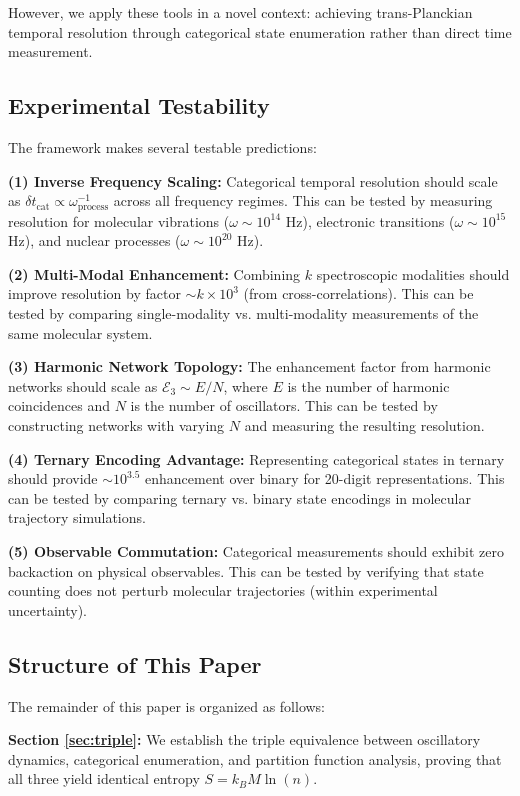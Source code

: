 \documentclass[twocolumn,10pt]{article}
\theoremstyle{remark}
\begin{document}
However, we apply these tools in a novel context: achieving trans-Planckian temporal resolution through categorical state enumeration rather than direct time measurement.

\subsection{Experimental Testability}

The framework makes several testable predictions:

\textbf{(1) Inverse Frequency Scaling:} Categorical temporal resolution should scale as $\delta t_{\text{cat}} \propto \omega_{\text{process}}^{-1}$ across all frequency regimes. This can be tested by measuring resolution for molecular vibrations ($\omega \sim 10^{14}$ Hz), electronic transitions ($\omega \sim 10^{15}$ Hz), and nuclear processes ($\omega \sim 10^{20}$ Hz).

\textbf{(2) Multi-Modal Enhancement:} Combining $k$ spectroscopic modalities should improve resolution by factor $\sim k \times 10^3$ (from cross-correlations). This can be tested by comparing single-modality vs. multi-modality measurements of the same molecular system.

\textbf{(3) Harmonic Network Topology:} The enhancement factor from harmonic networks should scale as $\mathcal{E}_3 \sim E/N$, where $E$ is the number of harmonic coincidences and $N$ is the number of oscillators. This can be tested by constructing networks with varying $N$ and measuring the resulting resolution.

\textbf{(4) Ternary Encoding Advantage:} Representing categorical states in ternary should provide $\sim 10^{3.5}$ enhancement over binary for 20-digit representations. This can be tested by comparing ternary vs. binary state encodings in molecular trajectory simulations.

\textbf{(5) Observable Commutation:} Categorical measurements should exhibit zero backaction on physical observables. This can be tested by verifying that state counting does not perturb molecular trajectories (within experimental uncertainty).

\subsection{Structure of This Paper}

The remainder of this paper is organized as follows:

\textbf{Section \ref{sec:triple}:} We establish the triple equivalence between oscillatory dynamics, categorical enumeration, and partition function analysis, proving that all three yield identical entropy $S = k_B M \ln(n)$.
\end{document}
